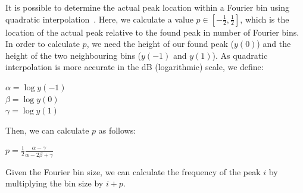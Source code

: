 \documentclass[10pt,twocolumn]{article}
\begin{document}
It is possible to determine the actual peak location within a Fourier bin using quadratic interpolation~\cite{interpol2}. Here, we calculate a value $p \in [-\frac{1}{2}, \frac{1}{2}]$, which is the location of the actual peak relative to the found peak in number of Fourier bins. In order to calculate $p$, we need the height of our found peak ($y(0)$) and the height of the two neighbouring bins ($y(-1)$ and $y(1)$). As quadratic interpolation is more accurate in the dB (logarithmic) scale, we define:
\begin{center}\vspace{-1mm}
    $\alpha = \log y(-1)$\\
    $\beta = \log y(0)$\\
    $\gamma = \log y(1)$
\end{center}\vspace{-1mm}
Then, we can calculate $p$ as follows:
\begin{center}\vspace{-1mm}
    $p = \frac{1}{2} \frac{\alpha - \gamma}{\alpha - 2\beta + \gamma}$
\end{center}\vspace{-1mm}
Given the Fourier bin size, we can calculate the frequency of the peak $i$ by multiplying the bin size by $i + p$.
\end{document}
